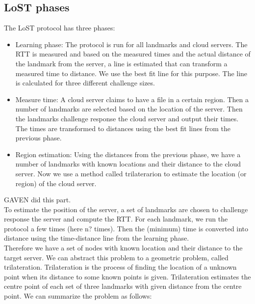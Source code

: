 \documentclass[12pt]{article}
\begin{document}
\subsection{LoST phases}
The LoST protocol has three phases:
\begin{itemize}
\item Learning phase: The protocol is run for all landmarks and cloud servers. The RTT 
is measured and based on the measured times and the actual distance of the landmark from the server, 
a line is estimated that can transform a measured time to distance. 
We use the best fit line for this purpose. The line is calculated for three different challenge sizes. 

\item Measure time: A cloud server claims to have a file in a certain region. 
Then a number of landmarks are selected based on the location of the server. Then the landmarks 
challenge response the cloud server and output their times. The times are transformed 
to distances using the best fit lines from the previous phase.

\item Region estimation: Using the distances from the previous phase, we have a number of 
landmarks with known locations and their distance to the cloud server. Now we use a method called 
trilaterarion to estimate the location (or region) of the cloud server.
\end{itemize}

GAVEN did this part.\\

To estimate the position of the server, a set of landmarks are chosen to
challenge response the server and compute the RTT. For each landmark, we 
run the protocol a few times (here n? times). Then the (minimum) time is
converted into distance using the time-distance line from the learning
phase. \\

Therefore we have a set of nodes with known location and their distance to the target server. 
We can abstract this problem to a geometric problem, called trilateration. 
Trilateration is the process of finding the location of a unknown point when its 
distance to some known points is given. Trilateration estimates the centre
point of each set of three landmarks with given distance from the centre
point. We can summarize the problem as follows:\\
\end{document}
